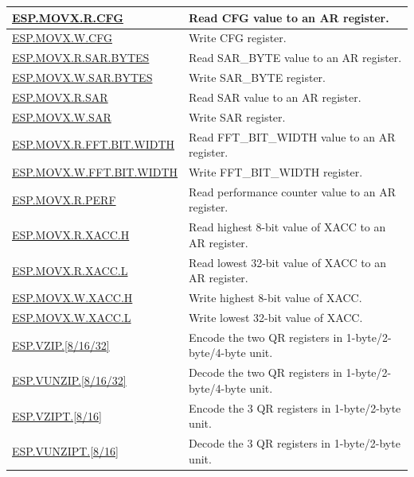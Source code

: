 \begin{longtable}[c]{|l|m{11cm}|}
    \hyperref[instruction:ESPMOVXRCFG]{ESP.MOVX.R.CFG} & Read CFG value to an AR register.
    \\\hline
    \hyperref[instruction:ESPMOVXWCFG]{ESP.MOVX.W.CFG} & Write CFG register.
    \\\hline
    \hyperref[instruction:ESPMOVXRSAR_BYTES]{ESP.MOVX.R.SAR.BYTES} & Read SAR\_BYTE value to an AR register.
    \\\hline
    \hyperref[instruction:ESPMOVXWSAR_BYTES]{ESP.MOVX.W.SAR.BYTES} & Write SAR\_BYTE register.
    \\\hline
    \hyperref[instruction:ESPMOVXRSAR]{ESP.MOVX.R.SAR} & Read SAR value to an AR register.
    \\\hline
    \hyperref[instruction:ESPMOVXWSAR]{ESP.MOVX.W.SAR} & Write SAR register.
    \\\hline
    \hyperref[instruction:ESPMOVXRFFT_BIT_WIDTH]{ESP.MOVX.R.FFT.BIT.WIDTH} & Read FFT\_BIT\_WIDTH value to an AR register.
    \\\hline
    \hyperref[instruction:ESPMOVXWFFT_BIT_WIDTH]{ESP.MOVX.W.FFT.BIT.WIDTH} & Write FFT\_BIT\_WIDTH register.
    \\\hline
    \hyperref[instruction:ESPMOVXRPERF]{ESP.MOVX.R.PERF} & Read performance counter value to an AR register.
    \\\hline
    \hyperref[instruction:ESPMOVXRXACCH]{ESP.MOVX.R.XACC.H} & Read highest 8-bit value of XACC to an AR register.
    \\\hline
    \hyperref[instruction:ESPMOVXRXACCL]{ESP.MOVX.R.XACC.L} & Read lowest 32-bit value of XACC to an AR register.
    \\\hline
    \hyperref[instruction:ESPMOVXWXACCH]{ESP.MOVX.W.XACC.H} & Write highest 8-bit value of XACC.
    \\\hline
    \hyperref[instruction:ESPMOVXWXACCL]{ESP.MOVX.W.XACC.L} & Write lowest 32-bit value of XACC.
    \\\hline
    \hyperref[instruction:ESPVZIP8]{ESP.VZIP.[8/16/32]} & Encode the two QR registers in 1-byte/2-byte/4-byte unit.
    \\\hline
    \hyperref[instruction:ESPVUNZIP8]{ESP.VUNZIP.[8/16/32]} & Decode the two QR registers in 1-byte/2-byte/4-byte unit.
    \\\hline
    \hyperref[instruction:ESPVZIPT8]{ESP.VZIPT.[8/16]} & Encode the 3 QR registers in 1-byte/2-byte unit.
    \\\hline
    \hyperref[instruction:ESPVUNZIPT8]{ESP.VUNZIPT.[8/16]} & Decode the 3 QR registers in 1-byte/2-byte unit.

\end{longtable}
